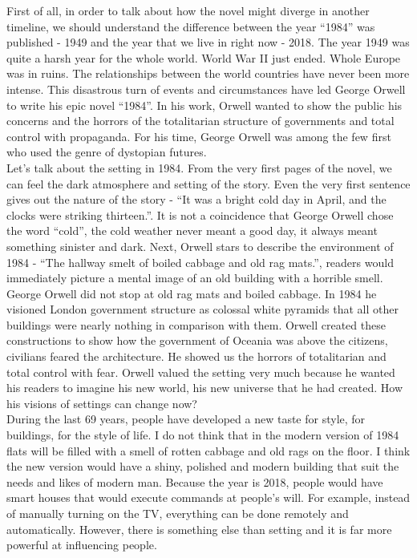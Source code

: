 \documentclass[a4paper,12pt]{article}
\begin{document}

First of all, in order to talk about how the novel might diverge in another timeline, we should understand the difference between the year ``1984'' was published - 1949 and the year that we live in right now - 2018. The year 1949 was quite a harsh year for the whole world. World War II just ended. Whole Europe was in ruins. The relationships between the world countries have never been more intense. This disastrous turn of events and circumstances have led George Orwell to write his epic novel ``1984''. In his work, Orwell wanted to show the public his concerns and the horrors of the totalitarian structure of governments and total control with propaganda. For his time, George Orwell was among the few first who used the genre of dystopian futures.\\ 

Let's talk about the setting in 1984. From the very first pages of the novel, we can feel the dark atmosphere and setting of the story. Even the very first sentence gives out the nature of the story - ``It was a bright cold day in April, and the clocks were striking thirteen.''. It is not a coincidence that George Orwell chose the word ``cold'', the cold weather never meant a good day, it always meant something sinister and dark. Next, Orwell stars to describe the environment of 1984 - ``The hallway smelt of boiled cabbage and old rag mats.'', readers would immediately picture a mental image of an old building with a horrible smell. George Orwell did not stop at old rag mats and boiled cabbage. In 1984 he visioned London government structure as colossal white pyramids that all other buildings were nearly nothing in comparison with them. Orwell created these constructions to show how the government of Oceania was above the citizens, civilians feared the architecture. He showed us the horrors of totalitarian and total control with fear. Orwell valued the setting very much because he wanted his readers to imagine his new world, his new universe that he had created. How his visions of settings can change now?\\

During the last 69 years, people have developed a new taste for style, for buildings, for the style of life. I do not think that in the modern version of 1984 flats will be filled with a smell of rotten cabbage and old rags on the floor. I think the new version would have a shiny, polished and modern building that suit the needs and likes of modern man. Because the year is 2018, people would have smart houses that would execute commands at people's will. For example, instead of manually turning on the TV, everything can be done remotely and automatically. However, there is something else than setting and it is far more powerful at influencing people.\\
\end{document}
